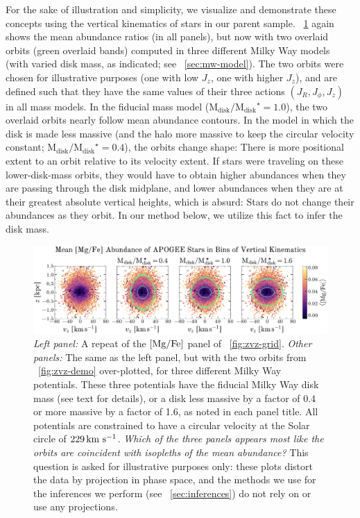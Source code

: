 \documentclass[modern]{aastex63}
\newcommand{\mdisk}{\ensuremath{\mathrm{M}_\mathrm{disk}}}
\newcommand{\mratio}{\ensuremath{\mdisk / \mdisk^\star}}
\begin{document}
For the sake of illustration and simplicity, we visualize and demonstrate these
concepts using the vertical kinematics of stars in our parent sample.
\figurename~\ref{fig:zvz-mgfe} again shows the mean  abundance
ratios (in all panels), but now with two overlaid orbits (green overlaid bands)
computed in three different Milky Way models (with varied disk mass, as
indicated; see \sectionname~\ref{sec:mw-model}).
The two orbits were chosen for illustrative purposes (one with low $J_z$, one
with higher $J_z$), and are defined such that they have the same values of their
three actions $(J_R, J_\phi, J_z)$ in all mass models.
In the fiducial mass model ($\mratio = 1.0$), the two overlaid orbits nearly
follow mean abundance contours.
In the model in which the disk is made less massive (and the halo more massive
to keep the circular velocity constant; $\mratio = 0.4$), the orbits change
shape:
There is more positional extent to an orbit relative to its velocity extent.
If stars were traveling on these lower-disk-mass orbits, they would have to
obtain higher abundances when they are passing through the disk midplane,
and lower abundances when they are at their greatest absolute vertical heights,
which is absurd: Stars do not change their abundances as they orbit.
In our method below, we utilize this fact to infer the disk mass.


\begin{figure}[!tp]
  \begin{mdframed}
    \color{captiongray}
  \begin{center}
  \includegraphics[width=\textwidth]{zvz-mean-MG_FE}
  \end{center}
  \caption{%
    \textsl{Left panel:} A repeat of the ${[\mathrm{Mg}/\mathrm{Fe}]}$ panel of
    \figurename~\ref{fig:zvz-grid}.
    \textsl{Other panels:} The same as the left panel, but with the two orbits
    from \figurename~\ref{fig:zvz-demo} over-plotted, for three different Milky
    Way potentials.
    These three potentials have the fiducial Milky Way disk mass (see text
    for details), or a disk less massive by a factor of 0.4 or more
    massive by a factor of 1.6, as noted in each panel title.
    All potentials are constrained to have a circular velocity at the
    Solar circle of $229\,\mathrm{km}~\mathrm{s}^{-1}$.
    \emph{Which of the three panels appears most like the orbits are
    coincident with isopleths of the mean abundance?}
    This question is asked for illustrative purposes only: these plots distort
    the data by projection in phase space, and the methods we use for the
    inferences we perform (see \sectionname~\ref{sec:inferences}) do not rely
    on or use any projections.
  \label{fig:zvz-mgfe}
  }
  \end{mdframed}
\end{figure}
\end{document}
